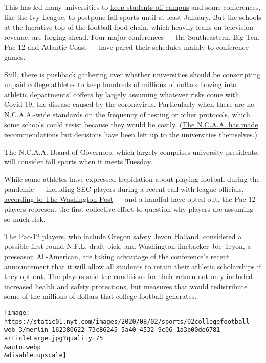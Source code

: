 This has led many universities to
\href{https://www.nytimes.com/2020/07/08/upshot/virus-colleges-harvard-reopening.html}{keep
students off campus} and some conferences, like the Ivy League, to
postpone fall sports until at least January. But the schools at the
lucrative top of the football food chain, which heavily leans on
television revenue, are forging ahead. Four major conferences --- the
Southeastern, Big Ten, Pac-12 and Atlantic Coast --- have pared their
schedules mainly to conference games.

Still, there is pushback gathering over whether universities should be
conscripting unpaid college athletes to keep hundreds of millions of
dollars flowing into athletic departments' coffers by largely assuming
whatever risks come with Covid-19, the disease caused by the
coronavirus. Particularly when there are no N.C.A.A.-wide standards on
the frequency of testing or other protocols, which some schools could
resist because they would be costly.
(\href{https://www.nytimes.com/2020/07/16/sports/ncaafootball/ncaa-guidelines-fall-sports.html}{The
N.C.A.A. has made recommendations} but decisions have been left up to
the universities themselves.)

The N.C.A.A. Board of Governors, which largely comprises university
presidents, will consider fall sports when it meets Tuesday.

While some athletes have expressed trepidation about playing football
during the pandemic --- including SEC players during a recent call with
league officials,
\href{https://www.washingtonpost.com/sports/2020/08/01/sec-football-players-safety-meeting/}{according
to The Washington Post} --- and a handful have opted out, the Pac-12
players represent the first collective effort to question why players
are assuming so much risk.

The Pac-12 players, who include Oregon safety Jevon Holland, considered
a possible first-round N.F.L. draft pick, and Washington linebacker Joe
Tryon, a preseason All-American, are taking advantage of the
conference's recent announcement that it will allow all students to
retain their athletic scholarships if they opt out. The players said the
conditions for their return not only included increased health and
safety protections, but measures that would redistribute some of the
millions of dollars that college football generates.

\texttt{[image: https://static01.nyt.com/images/2020/08/02/sports/02collegefootball-web-3/merlin\_162380622\_73c86245-5a40-4532-9c06-1a3b00de6781-articleLarge.jpg?quality=75\\\&auto=webp\\\&disable=upscale]}

